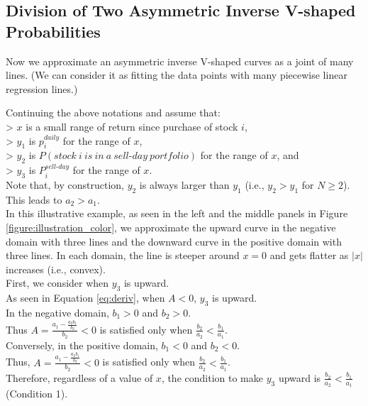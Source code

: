 \documentclass[11pt, a4paper]{article}
\begin{document}
\subsection{Division of Two Asymmetric Inverse V-shaped Probabilities}
\label{section:division_two_inverse_v}

Now we approximate an asymmetric inverse V-shaped curves as a joint of many lines. (We can consider it as fitting the data points with many piecewise linear regression lines.)

Continuing the above notations and assume that:\\
> $x$ is a small range of return since purchase of stock $i$,\\
> $y_1$ is $p^{daily}_{i}$ for the range of $x$,\\
> $y_2$ is $P(stock~i~is~in~a~sell\mbox{-}day~portfolio)$ for the range of $x$, and \\
> $y_3$ is $P^{sell\mbox{-}day}_{i}$ for the range of $x$. \\

\noindent
Note that, by construction, $y_2$ is always larger than $y_1$ (i.e., $y_2>y_1$ for $N \geq2$). This leads to $a_2>a_1$.\\

\noindent
In this illustrative example, as seen in the left and the middle panels in Figure \ref{figure:illustration_color}, we approximate the upward curve in the negative domain with three lines and the downward curve in the positive domain with three lines. In each domain, the line is steeper around $x=0$ and gets flatter as $|x|$ increases (i.e., convex).\\

\noindent
First, we consider when $y_3$ is upward.\\ 
As seen in Equation \ref{eq:deriv}, when $A<0$, $y_3$ is upward.\\

\noindent
In the negative domain, $b_1>0$ and $b_2>0$.\\
Thus $A = \frac{a_1-\frac{a_2 b_1}{b_2}}{b_2}<0$ is satisfied only when  $\frac{b_2}{a_2} < \frac{b_1}{a_1}$.\\

\noindent
Conversely, in the positive domain, $b_1<0$ and $b_2<0$.\\
Thus, $A = \frac{a_1-\frac{a_2 b_1}{b_2}}{b_2}<0$ is satisfied only when $\frac{b_2}{a_2} < \frac{b_1}{a_1}$.\\

\noindent
Therefore, regardless of a value of $x$, the condition to make $y_3$ upward is $\frac{b_2}{a_2} < \frac{b_1}{a_1}$  (Condition 1).\\
\end{document}
